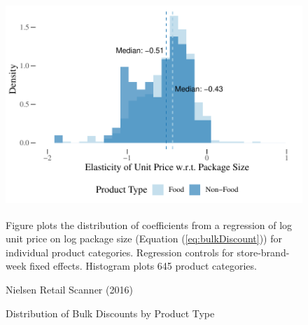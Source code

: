 \documentclass[AER]{AEA_mal}
\begin{document}
\begin{figure}[!htb]
 \centering
 \caption{Distribution of Bulk Discounts by Product Type}
 \includegraphics[width = 5in, height = 3in]{../5_figures/bulkDiscountAllProdsScanner.pdf}
 \begin{figurenotes}
Figure plots the distribution of coefficients from a regression of log unit price on log package size (Equation (\ref{eq:bulkDiscount})) for individual product categories. Regression controls for store-brand-week fixed effects. Histogram plots 645 product categories.
\end{figurenotes}
\begin{figurenotes}[Source]
Nielsen Retail Scanner (2016)
\end{figurenotes}
 \label{fig:bulkDiscountAllProds}
\end{figure}
\end{document}
